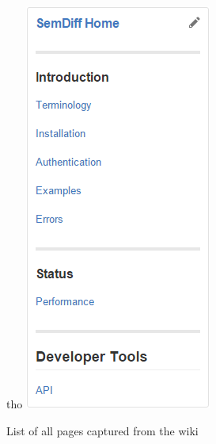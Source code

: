 \documentclass[draftclsnofoot,onecolumn]{IEEEtran}
\begin{document}
\begin{figure}[!t]
tho\centering
\includegraphics[width=\textwidth]{WikiList}

\caption{List of all pages captured from the wiki}
\label{wikilist}
\end{figure}
\end{document}
